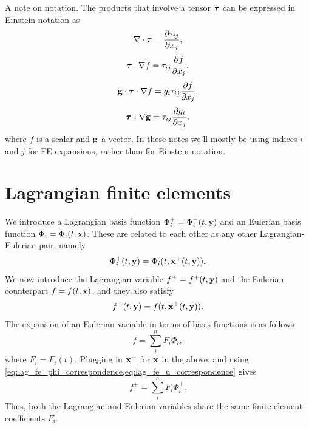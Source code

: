 \documentclass[11pt]{report}
\begin{document}
A note on notation. The products that involve a tensor $\bm \tau$ can be expressed in Einstein notation as
\begin{equation*}
    \nabla \cdot \bm \tau = \frac{\partial \tau_{ij}}{\partial x_j},
\end{equation*}
\begin{equation*}
    \bm \tau \cdot \nabla f = \tau_{ij} \frac{\partial f}{\partial x_j},
\end{equation*}
\begin{equation*}
    \mathbf{g} \cdot \bm \tau \cdot \nabla f = g_i \tau_{ij} \frac{\partial f}{\partial x_j},
\end{equation*}
\begin{equation*}
    \bm \tau : \nabla \mathbf{g} = \tau_{ij} \frac{\partial g_i}{\partial x_j}.
\end{equation*}
where $f$ is a scalar and $\mathbf{g}$ a vector. In these notes we'll mostly be using indices $i$ and $j$ for FE expansions, rather than for Einstein notation.

\section{Lagrangian finite elements}
\label{sec:lag_fin_elem}
We introduce a Lagrangian basis function $\Phi_i^+ = \Phi_i^+(t,\mathbf{y})$ and an Eulerian basis function $\Phi_i = \Phi_i(t,\mathbf{x})$. These are related to each other as any other Lagrangian-Eulerian pair, namely 
\begin{equation}
    \label{eq:lag_fe_phi_correspondence}
    \Phi_i^+(t,\mathbf{y}) = \Phi_i(t,\mathbf{x}^+(t,\mathbf{y})).
\end{equation}
We now introduce the Lagrangian variable $f^+ = f^+(t,\mathbf{y})$ and the Eulerian counterpart $f = f(t,\mathbf{x})$, and they also satisfy
\begin{equation}
    \label{eq:lag_fe_u_correspondence}
    f^+(t,\mathbf{y}) = f(t,\mathbf{x}^+(t,\mathbf{y})).
\end{equation}
The expansion of an Eulerian variable in terms of basis functions is as follows
\begin{equation}
    \label{eq:lag_fe_expansion_eul}
    f = \sum_i^n F_i \Phi_i,
\end{equation}
where $F_i = F_i(t)$. Plugging in $\mathbf{x}^+$ for $\mathbf{x}$ in the above, and using \cref{eq:lag_fe_phi_correspondence,eq:lag_fe_u_correspondence} gives
\begin{equation}
    \label{eq:fe_lag_expansion_lag}
    f^+ = \sum_i^n F_i \Phi_i^+.
\end{equation}
Thus, both the Lagrangian and Eulerian variables share the same finite-element coefficients $F_i$. 
\end{document}
